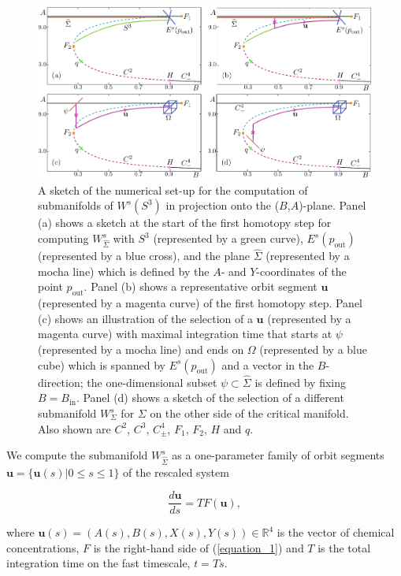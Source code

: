 \documentclass{ws-ijbc}
\begin{document}
\begin{figure}[h]
\centering
\includegraphics[]{./figures/MKMO_3.pdf}
\caption{A sketch of the numerical set-up for the computation of submanifolds of $W^s(S^3)$ in projection onto the ($B$,$A$)-plane.  Panel (a) shows a sketch at the start of the first homotopy step for computing $W^{s}_{\widehat{\Sigma}}$ with $S^3$ (represented by a green curve), $E^s(p_{\text{out}})$ (represented by a blue cross), and the plane $\widehat{\Sigma}$ (represented by a mocha line) which is defined by the $A$- and $Y$-coordinates of the point $p_{\text{out}}$.  Panel (b) shows a representative orbit segment $\mathbf{u}$ (represented by a magenta curve) of the first homotopy step.  Panel (c) shows an illustration of the selection of a $\mathbf{u}$ (represented by a magenta curve) with maximal integration time that starts at $\psi$ (represented by a mocha line) and ends on $\Omega$ (represented by a blue cube) which is spanned by $E^s(p_{\text{out}})$ and a vector in the $B$-direction; the one-dimensional subset $\psi \subset \widehat{\Sigma}$ is defined by fixing $B = B_{\text{in}}$.  Panel (d) shows a sketch of the selection of a different submanifold $W^{s}_{\Sigma}$ for $\Sigma$ on the other side of the critical manifold.  Also shown are $C^2$, $C^3$, $C^4_\pm$, $F_1$, $F_2$, $H$ and $q$.}
\end{figure}


We compute the submanifold $W^s_{\widehat{\Sigma}}$ as a one-parameter family of orbit segments $\mathbf{u} = \{\mathbf{u}(s)| 0 \leq s \leq 1 \}$ of the rescaled system

\begin{equation}
\frac{d\mathbf{u}}{ds} = TF(\mathbf{u}),
\label{equation_4}
\end{equation}
    
\noindent
where $\mathbf{u}(s) = (A(s), B(s), X(s), Y(s)) \in \mathbb{R}^4$ is the vector of chemical concentrations, $F$ is the right-hand side of (\ref{equation_1}) and $T$ is the total integration time on the fast timescale, $t=Ts$.
    
\end{document}
